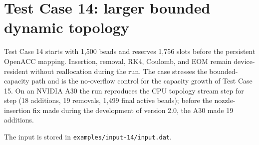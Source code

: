 \section{Test Case 14: larger bounded dynamic topology}

Test Case 14 starts with 1,500 beads and reserves 1,756 slots before the
persistent OpenACC mapping. Insertion, removal, RK4, Coulomb, and EOM remain
device-resident without reallocation during the run. The case stresses the
bounded-capacity path and is the no-overflow control for the capacity growth
of Test Case 15.
On an NVIDIA A30 the run reproduces the CPU topology stream step for step
(18 additions, 19 removals, 1,499 final active beads); before the
nozzle-insertion fix made during the development of version 2.0, the A30
made 19 additions.

The input is stored in \texttt{examples/input-14/input.dat}.
